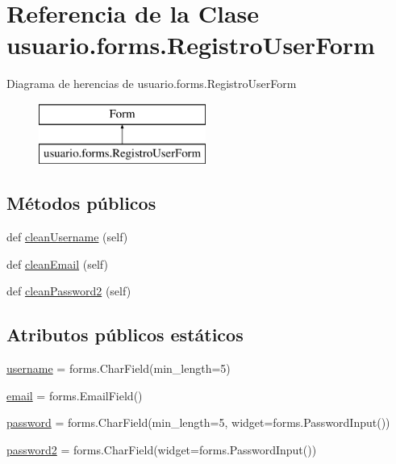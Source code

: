 \hypertarget{classusuario_1_1forms_1_1_registro_user_form}{}\section{Referencia de la Clase usuario.\+forms.\+Registro\+User\+Form}
\label{classusuario_1_1forms_1_1_registro_user_form}
Diagrama de herencias de usuario.\+forms.\+Registro\+User\+Form\begin{figure}[H]
\begin{center}
\leavevmode
\includegraphics[height=2.000000cm]{classusuario_1_1forms_1_1_registro_user_form}
\end{center}
\end{figure}
\subsection*{Métodos públicos}
\begin{DoxyCompactItemize}
\item 
def \hyperlink{classusuario_1_1forms_1_1_registro_user_form_a928eddb05230c6e54cf127b5f9f8e136}{clean\+Username} (self)
\item 
def \hyperlink{classusuario_1_1forms_1_1_registro_user_form_adfdd875682aed5617ef4ced4b5873382}{clean\+Email} (self)
\item 
def \hyperlink{classusuario_1_1forms_1_1_registro_user_form_a1abd5ab69674feaeac57eb7e22cefd5b}{clean\+Password2} (self)
\end{DoxyCompactItemize}
\subsection*{Atributos públicos estáticos}
\begin{DoxyCompactItemize}
\item 
\hyperlink{classusuario_1_1forms_1_1_registro_user_form_aa7a52509d98f74c030597cb5edfec969}{username} = forms.\+Char\+Field(min\+\_\+length=5)
\item 
\hyperlink{classusuario_1_1forms_1_1_registro_user_form_a226074f70cfa953b71f8b76aa3e9d0f2}{email} = forms.\+Email\+Field()
\item 
\hyperlink{classusuario_1_1forms_1_1_registro_user_form_aae8a355143f32fae719b573908b9edd0}{password} = forms.\+Char\+Field(min\+\_\+length=5, widget=forms.\+Password\+Input())
\item 
\hyperlink{classusuario_1_1forms_1_1_registro_user_form_acbad77fd91e846f569ddfe7cf664afc2}{password2} = forms.\+Char\+Field(widget=forms.\+Password\+Input())
\end{DoxyCompactItemize}


